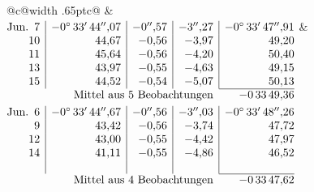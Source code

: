 \noindent\begin{tabular}{@{}c@{\hspace{.4em}\vrule width .65pt\hspace{.4em}}c@{}}
 &
 \\[.18ex]
\(\begin{array}[t]{@{}r|r|r|r|r@{}}
\text{Jun.}\enspace 7 & -0^\circ\,33'\,44''{,}07 & -0''{,}57 & -3''{,}27 & -0^\circ\,33'\,47''{,}91\\
10 & 44{,}67 & -0{,}56 & -3{,}97 & 49{,}20\\
11 & 45{,}64 & -0{,}56 & -4{,}20 & 50{,}40\\
13 & 43{,}97 & -0{,}55 & -4{,}63 & 49{,}15\\
15 & 44{,}52 & -0{,}54 & -5{,}07 & 50{,}13\\
\cline{5-5}
\multicolumn{4}{r}{\text{Mittel aus 5 Beobachtungen}} & -0\,33\,49{,}36
\end{array}\)
&
\(\begin{array}[t]{@{}r|r|r|r|r@{}}
\text{Jun.}\enspace 6 & -0^\circ\,33'\,44''{,}67 & -0''{,}56 & -3''{,}03 & -0^\circ\,33'\,48''{,}26\\
9 & 43{,}42 & -0{,}56 & -3{,}74 & 47{,}72\\
12 & 43{,}00 & -0{,}55 & -4{,}42 & 47{,}97\\
14 & 41{,}11 & -0{,}55 & -4{,}86 & 46{,}52\\
 & & & & \\
\cline{5-5}
\multicolumn{4}{r}{\text{Mittel aus 4 Beobachtungen}} & -0\,33\,47{,}62
\end{array}\)
\end{tabular}\par\medskip
{}
